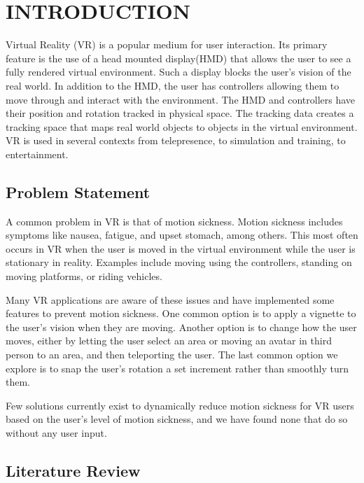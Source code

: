 \chapter{INTRODUCTION}
\label{ch:intro}

Virtual Reality (VR) is a popular medium for user interaction.
Its primary feature is the use of a head mounted display(HMD) that allows the user to see a fully rendered virtual environment.
Such a display blocks the user's vision of the real world.
In addition to the HMD, the user has controllers allowing them to move through and interact with the environment.
The HMD and controllers have their position and rotation tracked in physical space.
The tracking data creates a tracking space that maps real world objects to objects in the virtual environment.
VR is used in several contexts from telepresence\cite{HOANG2023102378}, to simulation and training\cite{hbrCompaniesUsing}, to entertainment\cite{Bigscreen}.

\section{Problem Statement}
\label{sec:problem_statement}

A common problem in VR is that of motion sickness.
Motion sickness includes symptoms like nausea, fatigue, and upset stomach, among others.
This most often occurs in VR when the user is moved in the virtual environment while the user is stationary in reality\cite{Reason1978-im}.
Examples include moving using the controllers, standing on moving platforms, or riding vehicles.

Many VR applications are aware of these issues and have implemented some features to prevent motion sickness.
One common option is to apply a vignette\cite{TunnelingVignette} to the user's vision when they are moving.
Another option is to change how the user moves, either by letting the user select an area or moving an avatar in third person to an area, and then teleporting the user\cite{TeleportationProvider}.
The last common option we explore is to snap the user's rotation a set increment rather than smoothly turn them\cite{SnapTurn}.

Few solutions currently exist to dynamically reduce motion sickness for VR users based on the user's level of motion sickness, and we have found none that do so without any user input.

\section{Literature Review}
\label{sec:lit_review}

